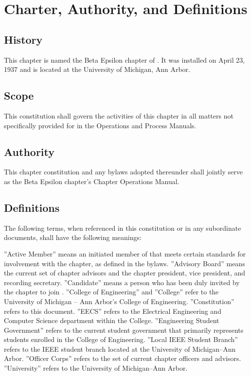 \chapter{Charter, Authority, and Definitions}\label{sec:definitions}

\section{History}
This chapter is named the Beta Epsilon chapter of \hkn.  It was installed on April 23, 1937 and is located at the University of Michigan, Ann Arbor.

\section{Scope}
This constitution shall govern the activities of this chapter in all matters not specifically provided for in the \hkn Operations and Process Manuals.

\section{Authority}
This chapter constitution and any bylaws adopted thereunder shall jointly serve as the Beta Epsilon chapter's Chapter Operations Manual.

\section{Definitions}
The following terms, when referenced in this constitution or in any subordinate documents, shall have the following meanings:
\begin{enumsubsection}

\itemnotoc ''Active Member'' means an initiated member of \hkn that meets certain standards for involvement with the chapter, as defined in the bylaws.
\itemnotoc ''Advisory Board'' means the current set of chapter advisors and the chapter president, vice president, and recording secretary.
\itemnotoc ''Candidate'' means a person who has been duly invited by the chapter to join \hkn.
\itemnotoc ''College of Engineering'' and ''College'' refer to the University of Michigan -- Ann Arbor's College of Engineering.
\itemnotoc ''Constitution'' refers to this document.
\itemnotoc ''EECS'' refers to the Electrical Engineering and Computer Science department within the College.
\itemnotoc ''Engineering Student Government'' refers to the current student government that primarily represents students enrolled in the College of Engineering.
\itemnotoc ''Local IEEE Student Branch'' refers to the IEEE student branch located at the University of Michigan--Ann Arbor.
\itemnotoc ''Officer Corps'' refers to the set of current chapter officers and advisors.
\itemnotoc ''University'' refers to the University of Michigan--Ann Arbor.

\end{enumsubsection}

